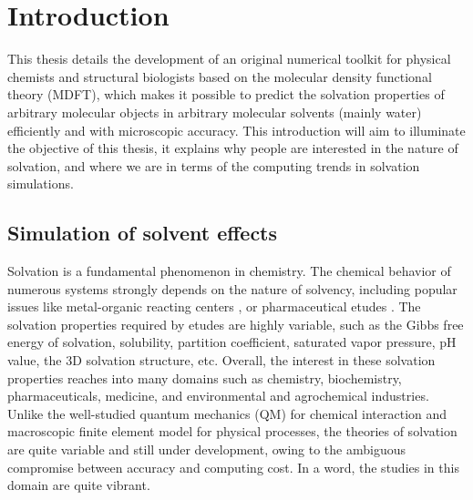 
\chapter{Introduction\label{chpt:introduction}}

This thesis details the development of an original numerical toolkit for
physical chemists and structural biologists based on the molecular
density functional theory (\acs{MDFT}), which makes it possible to
predict the solvation properties of arbitrary molecular objects in arbitrary molecular solvents
(mainly water) efficiently and with microscopic accuracy. This introduction will aim to illuminate the objective
of this thesis, it explains why people are interested in the nature
of solvation, and where we are in terms of the computing trends in solvation
simulations.


\section{Simulation of solvent effects}

Solvation is a fundamental phenomenon in chemistry. The chemical behavior
of numerous systems strongly depends on the nature of solvency, including popular issues like metal-organic reacting centers
\citep{Mn-oxo,PCET}, or pharmaceutical etudes \citep{drug_1_Perlovich,drug_2_Perlovich,drug_3}.
The solvation properties required by etudes %
are highly variable, such
as the Gibbs free energy of solvation, solubility, partition coefficient,
saturated vapor pressure, pH value, the 3D solvation structure,
etc. Overall, the interest in these solvation properties reaches into
many domains such as chemistry, biochemistry, pharmaceuticals, medicine, and
environmental and agrochemical industries. Unlike the well-studied
quantum mechanics (\acs{QM}) for chemical interaction and macroscopic
finite element model for physical processes, the theories of solvation
are quite variable and still under development, owing to the ambiguous
compromise between accuracy and computing cost. In a word,
the studies in this domain are quite vibrant.

